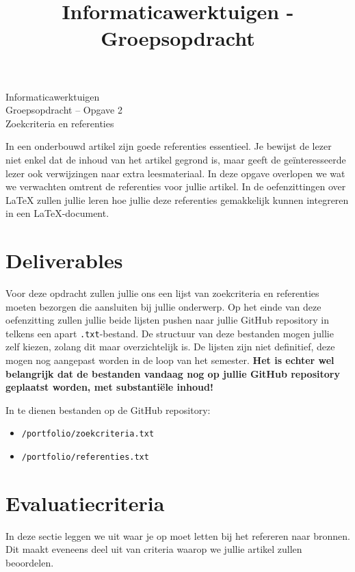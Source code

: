 \documentclass[a4paper]{article}
\title{Informaticawerktuigen - Groepsopdracht}
\begin{document}
\begin{center}
  \huge Informaticawerktuigen \\
  \Huge Groepsopdracht -- Opgave 2 \\
  \huge Zoekcriteria en referenties \\
\end{center}
\vspace{1em}


In een onderbouwd artikel zijn goede referenties essentieel.
Je bewijst de lezer niet enkel dat de inhoud van het artikel gegrond is, maar geeft de ge\"interesseerde lezer ook verwijzingen naar extra leesmateriaal.
In deze opgave overlopen we wat we verwachten omtrent de referenties voor jullie artikel.
In de oefenzittingen over \LaTeX{} zullen jullie leren hoe jullie deze referenties gemakkelijk kunnen integreren in een \LaTeX{}-document.


\section{Deliverables}

Voor deze opdracht zullen jullie ons een lijst van zoekcriteria en referenties moeten bezorgen die aansluiten bij jullie onderwerp.
Op het einde van deze oefenzitting zullen jullie beide lijsten pushen naar jullie GitHub repository in telkens een apart \texttt{.txt}-bestand.
De structuur van deze bestanden mogen jullie zelf kiezen, zolang dit maar overzichtelijk is.
De lijsten zijn niet definitief, deze mogen nog aangepast worden in de loop van het semester.
\textbf{Het is echter wel belangrijk dat de bestanden vandaag nog op jullie GitHub repository geplaatst worden, met substanti\"ele inhoud!}

In te dienen bestanden op de GitHub repository:

\begin{itemize}
	\item \texttt{/portfolio/zoekcriteria.txt}
	\item \texttt{/portfolio/referenties.txt}
\end{itemize}


\section{Evaluatiecriteria}

In deze sectie leggen we uit waar je op moet letten bij het refereren naar bronnen.
Dit maakt eveneens deel uit van criteria waarop we jullie artikel zullen beoordelen.
\end{document}
